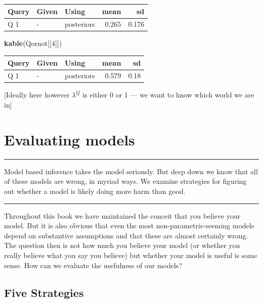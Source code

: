 \documentclass[
  12pt,
]{book}
\newenvironment{Shaded}{\begin{snugshade}}{\end{snugshade}}
\newcommand{\DecValTok}[1]{\textcolor[rgb]{0.00,0.00,0.81}{#1}}
\newcommand{\KeywordTok}[1]{\textcolor[rgb]{0.13,0.29,0.53}{\textbf{#1}}}
\newcommand{\NormalTok}[1]{#1}
\begin{document}
\begin{tabular}{l|l|l|r|r}
\hline
Query & Given & Using & mean & sd\\
\hline
Q 1 & - & posteriors & 0.265 & 0.176\\
\hline
\end{tabular}

\begin{Shaded}
\begin{Highlighting}[]
\KeywordTok{kable}\NormalTok{(Qornot[[}\DecValTok{4}\NormalTok{]])}
\end{Highlighting}
\end{Shaded}

\begin{tabular}{l|l|l|r|r}
\hline
Query & Given & Using & mean & sd\\
\hline
Q 1 & - & posteriors & 0.579 & 0.18\\
\hline
\end{tabular}

{[}Ideally here however \(\lambda^Q\) is either 0 or 1 --- we want to know which world we are in{]}

\hypertarget{evaluation}{%
\chapter{Evaluating models}\label{evaluation}}

\begin{center}\rule{0.5\linewidth}{0.5pt}\end{center}

Model based inference takes the model seriously. But deep down we know that all of these models are wrong, in myriad ways. We examine strategies for figuring out whether a model is likely doing more harm than good.

\begin{center}\rule{0.5\linewidth}{0.5pt}\end{center}

Throughout this book we have maintained the conceit that you believe your model. But it is also obvious that even the most non-parametric-seeming models depend on substantive assumptions and that these are almost certainly wrong. The question then is not how much you believe your model (or whether you really believe what you say you believe) but whether your model is useful is some sense. How can we evaluate the usefulness of our models?

\hypertarget{five-strategies}{%
\section{Five Strategies}\label{five-strategies}}
\end{document}
